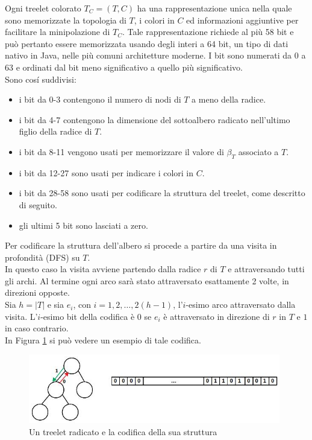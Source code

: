 Ogni treelet colorato $ T_C = (T,C) $ ha una rappresentazione unica nella quale sono memorizzate la topologia di $ T $, i colori in $ C $ ed informazioni aggiuntive per facilitare la minipolazione di $T_C$.
Tale rappresentazione richiede al pi\`u 58 bit e pu\`o pertanto essere memorizzata usando degli interi a 64 bit, un tipo di dati nativo in Java, nelle pi\`u comuni architetture moderne.
I bit sono numerati da 0 a 63 e ordinati dal bit meno significativo a quello pi\`u significativo.\\
Sono cos\'i suddivisi:
\begin{itemize}
	\item i bit da 0-3 contengono il numero di nodi di $ T $ a meno della radice.
	\item i bit da 4-7 contengono la dimensione del sottoalbero radicato nell'ultimo figlio della radice di $ T $.
	\item i bit da 8-11 vengono usati per memorizzare il valore di $ \beta_T $ associato a $ T $.
	\item i bit da 12-27 sono usati per indicare i colori in $ C $.
	\item i bit da 28-58 sono usati per codificare la struttura del treelet, come descritto di seguito.
	\item gli ultimi 5 bit sono lasciati a zero.
\end{itemize}\mbox{}

Per codificare la struttura dell'albero si procede a partire da una visita in profondit\`a (DFS) su $ T $.\\
In questo caso la visita avviene partendo dalla radice $ r $ di $ T $ e attraversando tutti gli archi. Al termine ogni arco sar\`a stato attraversato esattamente 2 volte, in direzioni opposte. \\
Sia $h=|T|$ e sia $e_i$, con $i = 1, 2, \dots, 2(h-1)$, l'$i$-esimo arco attraversato dalla visita. 
L'$i$-esimo bit della codifica \`e $0$ se $e_i$ \`e attraversato in direzione di $r$ in $T$ e $1$ in caso contrario.\\
 In Figura \ref{figura} si pu\`o vedere un esempio di tale codifica.

\begin{figure}[htbp]
	\centering
	\includegraphics[width=11cm]{capitolo2/grafo3}
	\caption{Un treelet radicato e la codifica della sua struttura}
	\label{figura}
\end{figure}

